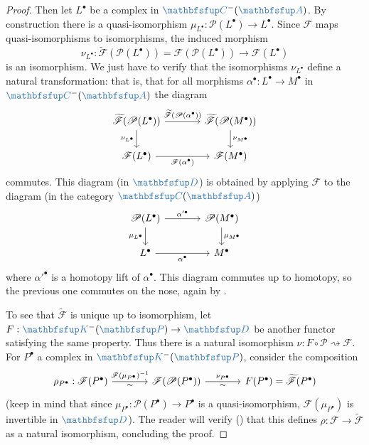 \begin{proof}
  Then let $L^\bullet$ be a complex in $\categ{C}^-(\categ{A})$. By
  construction there is a quasi-isomorphism
  $\mu_{L^\bullet} : \mathscr{P}(L^\bullet) \to L^\bullet$. Since
  $\mathscr{F}$ maps quasi-isomorphisms to isomorphisms, the induced
  morphism
  \[
    \nu_{L^\bullet} : \widetilde{\mathscr{F}}(\mathscr{P}(L^\bullet))
    = \mathscr{F}(\mathscr{P}(L^\bullet)) \longrightarrow
    \mathscr{F}(L^\bullet)
  \]
  is an isomorphism. We just have to verify that the isomorphisms
  $\nu_{L^\bullet}$ define a natural transformation: that is, that for
  all morphisms $\alpha^\bullet : L^\bullet \to M^\bullet$ in
  $\categ{C}^-(\categ{A})$ the diagram
  \[\begin{tikzcd}[column sep=large]
      \widetilde{\mathscr{F}}(\mathscr{P}(L^\bullet)) \arrow[r,
      "\widetilde{\mathscr{F}}(\mathscr{P}(\alpha^\bullet))"]
      \arrow[d, "\nu_{L^\bullet}"'] &
      \widetilde{\mathscr{F}}(\mathscr{P}(M^\bullet))
      \arrow[d, "\nu_{M^\bullet}"] \\
      \mathscr{F}(L^\bullet) \arrow[r, "\mathscr{F}(\alpha^\bullet)"']
      & \mathscr{F}(M^\bullet)
    \end{tikzcd}\] commutes. This diagram (in $\categ{D}$) is obtained
  by applying $\mathscr{F}$ to the diagram (in the category
  $\categ{C}(\categ{A})$)
  \[\begin{tikzcd}[column sep=large]
      \mathscr{P}(L^\bullet) \arrow[r, "\alpha'^\bullet"] \arrow[d,
      "\mu_{L^\bullet}"'] & \mathscr{P}(M^\bullet)
      \arrow[d, "\mu_{M^\bullet}"] \\
      L^\bullet \arrow[r, "\alpha^\bullet"'] & M^\bullet
    \end{tikzcd}\] where $\alpha'^\bullet$ is a homotopy lift of
  $\alpha^\bullet$.  This diagram commutes up to homotopy, so the
  previous one commutes on the nose, again by
  .

  To see that $\widetilde{\mathscr{F}}$ is unique up to isomorphism,
  let $F : \categ{K}^-(\categ{P}) \to \categ{D}$ be another functor
  satisfying the same property. Thus there is a natural isomorphism
  $\nu : F \circ \mathscr{P} \rightsquigarrow \mathscr{F}$. For
  $P^\bullet$ a complex in $\categ{K}^-(\categ{P})$, consider the
  composition
  \[\begin{tikzcd}[column sep=large]
      \rho_{P^\bullet} : \mathscr{F}(P^\bullet) \arrow[r,
      "\mathscr{F}(\mu_{P^\bullet})^{-1}", "\sim"'] &
      \mathscr{F}(\mathscr{P}(P^\bullet)) \arrow[r, "\nu_{P^\bullet}",
      "\sim"'] & F(P^\bullet) = \widetilde{\mathscr{F}}(P^\bullet)
    \end{tikzcd}\] (keep in mind that since
  $\mu_{P^\bullet} : \mathscr{P}(P^\bullet) \to P^\bullet$ is a
  quasi-isomorphism, $\mathscr{F}(\mu_{P^\bullet})$ is invertible in
  $\categ{D}$). The reader will verify
  () that this
  defines $\rho : \mathscr{F} \to \widetilde{\mathscr{F}}$ as a
  natural isomorphism, concluding the proof.
\end{proof}

